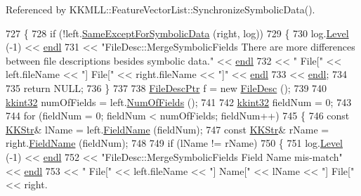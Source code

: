 Referenced by K\+K\+M\+L\+L\+::\+Feature\+Vector\+List\+::\+Synchronize\+Symbolic\+Data().


\begin{DoxyCode}
727 \{
728   \textcolor{keywordflow}{if}  (!left.\hyperlink{class_k_k_m_l_l_1_1_file_desc_af6f2e91a57a645694ee095018a2f1aff}{SameExceptForSymbolicData} (right, log))
729   \{
730     log.\hyperlink{class_k_k_b_1_1_run_log_a32cf761d7f2e747465fd80533fdbb659}{Level} (-1) << \hyperlink{namespace_k_k_b_ad1f50f65af6adc8fa9e6f62d007818a8}{endl}
731                    << \textcolor{stringliteral}{"FileDesc::MergeSymbolicFields   There are more differences between file descriptions
       besides symbolic data."} << \hyperlink{namespace_k_k_b_ad1f50f65af6adc8fa9e6f62d007818a8}{endl}
732                    << \textcolor{stringliteral}{"          File["} << left.fileName << \textcolor{stringliteral}{"] File["} << right.fileName << \textcolor{stringliteral}{"]"} << 
      \hyperlink{namespace_k_k_b_ad1f50f65af6adc8fa9e6f62d007818a8}{endl}
733                    << \hyperlink{namespace_k_k_b_ad1f50f65af6adc8fa9e6f62d007818a8}{endl};
734 
735     \textcolor{keywordflow}{return}  NULL;
736   \}
737 
738   \hyperlink{class_k_k_m_l_l_1_1_file_desc}{FileDescPtr}  f = \textcolor{keyword}{new} \hyperlink{class_k_k_m_l_l_1_1_file_desc_a410f61294a928a3c31d9d806504d7abf}{FileDesc} ();
739 
740   \hyperlink{namespace_k_k_b_a8fa4952cc84fda1de4bec1fbdd8d5b1b}{kkint32}  numOfFields = left.\hyperlink{class_k_k_m_l_l_1_1_file_desc_a07abdfb77949dee565c555c7651581c2}{NumOfFields} ();
741 
742   \hyperlink{namespace_k_k_b_a8fa4952cc84fda1de4bec1fbdd8d5b1b}{kkint32}  fieldNum = 0;
743 
744   \textcolor{keywordflow}{for}  (fieldNum = 0;  fieldNum < numOfFields;  fieldNum++)
745   \{
746     \textcolor{keyword}{const} \hyperlink{class_k_k_b_1_1_k_k_str}{KKStr}&  lName = left.\hyperlink{class_k_k_m_l_l_1_1_file_desc_a703b2f8283fc0cd4dfbf03308a9d0938}{FieldName} (fieldNum);
747     \textcolor{keyword}{const} \hyperlink{class_k_k_b_1_1_k_k_str}{KKStr}&  rName = right.\hyperlink{class_k_k_m_l_l_1_1_file_desc_a703b2f8283fc0cd4dfbf03308a9d0938}{FieldName} (fieldNum);
748 
749     \textcolor{keywordflow}{if}  (lName != rName)
750     \{
751       log.\hyperlink{class_k_k_b_1_1_run_log_a32cf761d7f2e747465fd80533fdbb659}{Level} (-1) << \hyperlink{namespace_k_k_b_ad1f50f65af6adc8fa9e6f62d007818a8}{endl}
752                      << \textcolor{stringliteral}{"FileDesc::MergeSymbolicFields   Field Name mis-match"} << 
      \hyperlink{namespace_k_k_b_ad1f50f65af6adc8fa9e6f62d007818a8}{endl}
753                      << \textcolor{stringliteral}{"          File["} << left.fileName << \textcolor{stringliteral}{"] Name["} << lName << \textcolor{stringliteral}{"]  File["} << right.

\end{DoxyCode}
